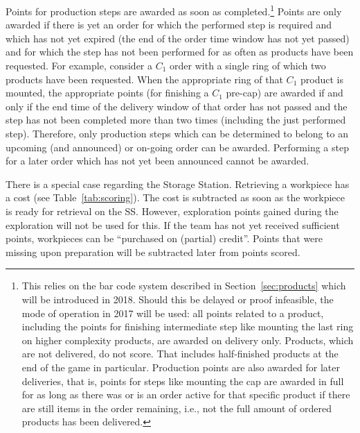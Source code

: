 \documentclass[12pt,twoside]{article}
\newcommand{\refsec}[1]{Section~\ref{#1}}
\newcommand{\reftab}[1]{Table~\ref{#1}}
\begin{document}
Points for production steps are awarded as soon as
completed.\footnote{This relies on the bar code system described in
  \refsec{sec:products} which will be introduced in 2018. Should this
  be delayed or proof infeasible, the mode of operation in 2017 will
  be used: all points related to a product, including the points for
  finishing intermediate step like mounting the last ring on higher
  complexity products, are awarded on delivery only. Products, which
  are not delivered, do not score. That includes half-finished
  products at the end of the game in particular. Production points are
  also awarded for later deliveries, that is, points for steps like
  mounting the cap are awarded in full for as long as there was or is
  an order active for that specific product if there are still items
  in the order remaining, i.e., not the full amount of ordered products
  has been delivered.}
%
Points are only awarded if there is yet an order for which the
performed step is required and which has not yet expired (the end of
the order time window has not yet passed) and for which the step has
not been performed for as often as products have been requested. For
example, consider a $C_1$ order with a single ring of which two
products have been requested. When the appropriate ring of that $C_1$
product is mounted, the appropriate points (for finishing a $C_1$
pre-cap) are awarded if and only if the end time of the delivery
window of that order has not passed and the step has not been
completed more than two times (including the just performed
step). Therefore, only production steps which can be determined to
belong to an upcoming (and announced) or on-going order can be
awarded. Performing a step for a later order which has not yet been
announced cannot be awarded.

There is a special case regarding the Storage Station. Retrieving a
workpiece has a cost (see \reftab{tab:scoring}). The cost is
subtracted as soon as the workpiece is ready for retrieval on the SS\@.
However, exploration points gained during the exploration will not be
used for this. If the team has not yet received sufficient points,
workpieces can be ``purchased on (partial) credit''. Points that were
missing upon preparation will be subtracted later from points scored.
\end{document}

